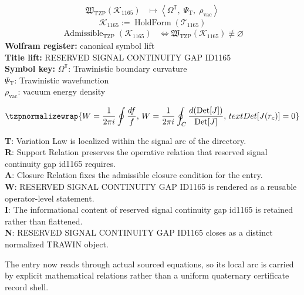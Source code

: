 \noindent
\begin{minipage}[t]{0.48\linewidth}
\begingroup
\small
\[
\begin{aligned}
\mathfrak{W}_{\mathrm{TZP}}\!\left(\mathcal{K}_{1165}\right)
&\longmapsto
\left\langle \Omega^{\mathbb{T}},\; \Psi_{\mathrm{T}},\; \rho_{\mathrm{vac}} \right\rangle
\end{aligned}
\]
\[
\mathcal{K}_{1165}
:=
\operatorname{HoldForm}\!\left(\mathcal{T}_{1165}\right)
\]
\[
\begin{aligned}
\operatorname{Admissible}_{\mathrm{TZP}}\!\left(\mathcal{K}_{1165}\right)
&\Longleftrightarrow
\mathfrak{W}_{\mathrm{TZP}}\!\left(\mathcal{K}_{1165}\right)\not\equiv\varnothing
\end{aligned}
\]
\textbf{Wolfram register:} canonical symbol lift\\
\textbf{Title lift:} RESERVED SIGNAL CONTINUITY GAP ID1165\\
\textbf{Symbol key:} \(\Omega^{\mathbb{T}}\): Trawinistic boundary curvature\\ \(\Psi_{\mathrm{T}}\): Trawinistic wavefunction\\ \(\rho_{\mathrm{vac}}\): vacuum energy density
\par
\endgroup
\end{minipage}\hfill
\begin{minipage}[t]{0.48\linewidth}
\[
\tzpnormalizewrap{W = \frac{1}{2\pi i} \oint \frac{df}{f},\,W = \frac{1}{2\pi i} \oint_C \frac{d({\rm Det}[J])}{{\rm Det}[J]},\,text{Det}[J(r_c)] = 0}
\]

\small
\textbf{T}: Variation Law is localized within the signal arc of the directory.\\
\textbf{R}: Support Relation preserves the operative relation that reserved signal continuity gap id1165 requires.\\
\textbf{A}: Closure Relation fixes the admissible closure condition for the entry.\\
\textbf{W}: RESERVED SIGNAL CONTINUITY GAP ID1165 is rendered as a reusable operator-level statement.\\
\textbf{I}: The informational content of reserved signal continuity gap id1165 is retained rather than flattened.\\
\textbf{N}: RESERVED SIGNAL CONTINUITY GAP ID1165 closes as a distinct normalized TRAWIN object.
\normalsize
\end{minipage}

The entry now reads through actual sourced equations, so its local arc is carried by explicit mathematical relations rather than a uniform quaternary certificate record shell.
\clearpage

